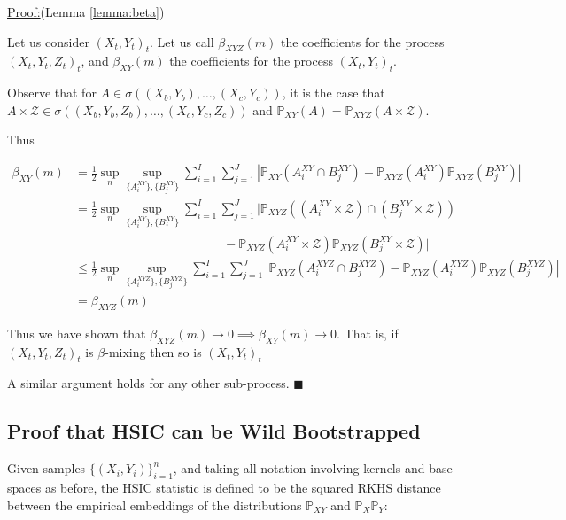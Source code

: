 \documentclass[]{article}
\newenvironment{claimproof}[1]{\par\noindent\underline{Proof:}\space#1}{\hfill $\blacksquare$}
\begin{document}
\begin{claimproof}(Lemma \ref{lemma:beta}) 

Let us consider $(X_t,Y_t)_t$.
Let us call $\beta_{XYZ}(m)$ the coefficients for the process $(X_t,Y_t,Z_t)_t$, and $\beta_{XY}(m)$ the coefficients for the process $(X_t,Y_t)_t$. 

Observe that for $A \in \sigma((X_b,Y_b),\ldots, (X_c,Y_c))$, it is the case that $A \times \mathcal{Z} \in \sigma((X_b,Y_b,Z_b),\ldots, (X_c,Y_c,Z_c))$ and $\mathbb{P}_{XY}(A) = \mathbb{P}_{XYZ}(A\times \mathcal{Z})$.

Thus

\begin{align*}
\beta_{XY}(m) &= \frac{1}{2} \sup_n \sup_{ \{A_i^{XY} \}, \{B_j^{XY} \} } \sum_{i=1}^I \sum_{j=1}^J | \mathbb{P}_{XY}(A_i^{XY} \cap B_j^{XY}) - \mathbb{P}_{XYZ}(A_i^{XY})\mathbb{P}_{XYZ}(B_j^{XY})| \\
&= \frac{1}{2} \sup_n \sup_{ \{A_i^{XY} \}, \{B_j^{XY} \} } \sum_{i=1}^I \sum_{j=1}^J | \mathbb{P}_{XYZ}((A_i^{XY}\times \mathcal{Z}) \cap (B_j^{XY} \times \mathcal{Z})) \\& \quad \quad\quad \quad \quad \quad\quad \quad \quad \quad\quad \quad- \mathbb{P}_{XYZ}(A_i^{XY}\times \mathcal{Z})\mathbb{P}_{XYZ}(B_j^{XY} \times \mathcal{Z})| \\
& \leq \frac{1}{2} \sup_n \sup_{ \{A_i^{XYZ} \}, \{B_j^{XYZ} \} } \sum_{i=1}^I \sum_{j=1}^J | \mathbb{P}_{XYZ}(A_i^{XYZ} \cap B_j^{XYZ}) - \mathbb{P}_{XYZ}(A_i^{XYZ})\mathbb{P}_{XYZ}(B_j^{XYZ})| \\
& = \beta_{XYZ}(m)
\end{align*}

Thus we have shown that  $\beta_{XYZ}(m) \longrightarrow 0 \implies \beta_{XY}(m) \longrightarrow 0$. That is, if  $(X_t,Y_t,Z_t)_t$ is $\beta$-mixing then so is  $(X_t,Y_t)_t$ 

A similar argument holds for any other sub-process.
\end{claimproof}

\subsection{Proof that HSIC can be Wild Bootstrapped}

Given samples $\{(X_i,Y_i)\}_{i=1}^n$, and taking all notation involving kernels and base spaces as before, the HSIC statistic is defined to be the squared RKHS distance between the empirical embeddings of the distributions $\mathbb{P}_{XY}$ and $\mathbb{P}_X\mathbb{P}_Y$:
\end{document}
